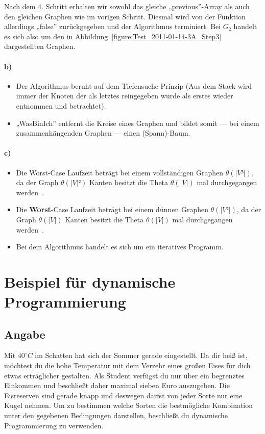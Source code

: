 \documentclass[a4paper, 12pt]{article}
\begin{document}
Nach dem 4. Schritt erhalten wir sowohl das gleiche „previous”-Array als auch den gleichen Graphen wie im vorigen Schritt. Diesmal wird von der Funktion allerdings „false” zurückgegeben und der Algorithmus terminiert. Bei $G₂$ handelt es sich also um den in Abbildung~\ref{figure:Test_2011-01-14-3A_Step3} dargestellten Graphen.

\paragraph{b)}

\begin{itemize}
	\item Der Algorithmus beruht auf dem Tiefensuche-Prinzip (Aus dem Stack wird immer der Knoten der als letztes reingegeben wurde als erstes wieder entnommen und betrachtet).
	\item „WasBinIch” entfernt die Kreise eines Graphen und bildet somit — bei einem zusammenhängenden Graphen — einen (Spann)-Baum.
\end{itemize}

\paragraph{c)}

\begin{itemize}
	\item Die Worst-Case Laufzeit beträgt bei einem vollständigen Graphen $θ\left(|V³|\right)$, da der Graph $θ\left(|V|²\right)$ Kanten besitzt die Theta $θ\left(|V|\right)$ mal durchgegangen werden~\cite{Juggl3r_Beispiel3}.
	\item Die \textbf{Worst}-Case Laufzeit beträgt bei einem dünnen Graphen $θ\left(|V²|\right)$, da der Graph $θ\left(|V|\right)$ Kanten besitzt die Theta $θ\left(|V|\right)$ mal durchgegangen werden~\cite{Juggl3r_Beispiel3}.
	\item Bei dem Algorithmus handelt es sich um ein iteratives Programm.
\end{itemize}

\section{Beispiel für dynamische Programmierung}

\subsection{Angabe}

Mit $40^{\circ}C$ im Schatten hat sich der Sommer gerade eingestellt. Da dir heiß ist, möchtest du die hohe Temperatur mit dem Verzehr eines großen Eises für dich etwas erträglicher gestalten. Als Student verfügst du nur über ein begrenztes Einkommen und beschließt daher maximal sieben Euro auszugeben. Die Eisreserven sind gerade knapp und deswegen darfst von jeder Sorte nur eine Kugel nehmen. Um zu bestimmen welche Sorten die bestmögliche Kombination unter den gegebenen Bedingungen darstellen, beschließt du dynamische Programmierung zu verwenden.
\end{document}
